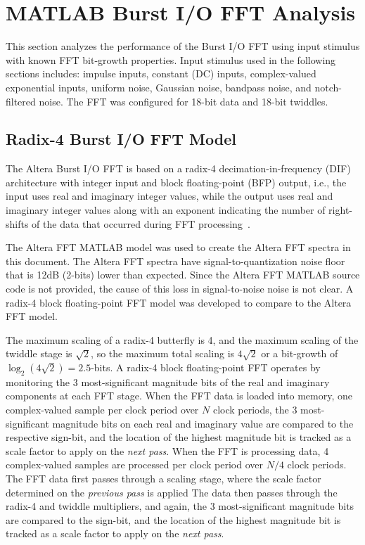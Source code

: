 \section{MATLAB Burst I/O FFT Analysis}
\label{sec:burst_analysis}

This section analyzes the performance of the Burst I/O FFT using input
stimulus with known FFT bit-growth properties. Input stimulus used in
the following sections includes: impulse inputs, constant (DC) inputs,
complex-valued exponential inputs, uniform noise,
Gaussian noise, bandpass noise, and notch-filtered noise.
The FFT was configured for 18-bit data and 18-bit twiddles.

\subsection{Radix-4 Burst I/O FFT Model}

The Altera Burst I/O FFT is based on a radix-4 decimation-in-frequency (DIF)
architecture with integer input and block floating-point (BFP) output, i.e.,
the input uses real and imaginary integer values, while the output uses
real and imaginary integer values along with an exponent indicating the
number of right-shifts of the data that occurred during FFT
processing~\cite{Altera_FFT_UG_2017}.

The Altera FFT MATLAB model was used to create the Altera FFT spectra in this
document. The Altera FFT spectra have signal-to-quantization noise floor that
is 12dB (2-bits) lower than expected. Since the Altera FFT MATLAB source code
is not provided, the cause of this loss in signal-to-noise noise is not clear.
A radix-4 block floating-point FFT model was developed to compare to the
Altera FFT model.

The maximum scaling of a radix-4 butterfly is 4, and the maximum scaling of
the twiddle stage is $\sqrt{2}$, so the maximum total scaling is $4\sqrt{2}$
or a bit-growth of $\log_2(4\sqrt{2}) = 2.5$-bits. A radix-4 block
floating-point FFT operates by monitoring the 3 most-significant magnitude
bits of the real and imaginary components at each FFT stage.
%
When the FFT data is loaded into memory, one complex-valued sample per clock
period over $N$ clock periods, the 3 most-significant magnitude bits on
each real and imaginary value are compared to the respective sign-bit, and the
location of the highest magnitude bit is tracked as a scale factor to apply on
the \emph{next pass}.
%
When the FFT is processing data, 4 complex-valued samples are processed
per clock period over $N/4$ clock periods. The FFT data first passes through
a scaling stage, where the scale factor determined on the \emph{previous pass}
is applied The data then passes through the radix-4 and twiddle multipliers,
and again, the 3 most-significant magnitude bits are compared to the sign-bit,
and the location of the highest magnitude bit is tracked as a scale factor to
apply on the \emph{next pass}.

